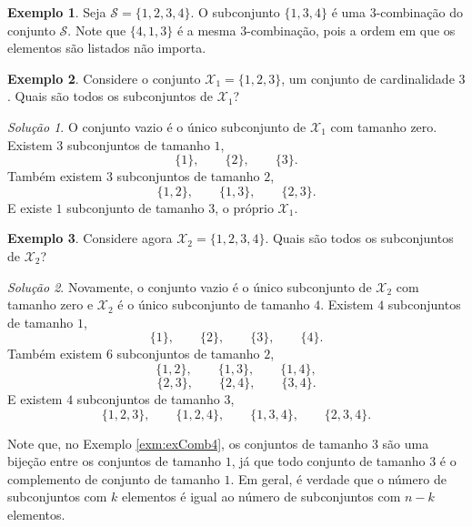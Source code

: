 \documentclass[]{book}
\theoremstyle{definition}
\theoremstyle{definition}
\newtheorem{example}{Exemplo}[chapter]
\theoremstyle{definition}
\theoremstyle{remark}
\newtheorem*{solution}{Solução}
\begin{document}
\begin{example}
\protect\hypertarget{exm:unnamed-chunk-64}{}{\label{exm:unnamed-chunk-64} }Seja \(\mathcal{S} = \{1,2,3,4\}\).
O subconjunto \(\{1,3,4\}\) é uma \(3\)-combinação do conjunto \(\mathcal{S}\).
Note que \(\{4,1,3\}\) é a mesma \(3\)-combinação, pois a ordem em que os elementos são listados não importa.
\end{example}

\begin{example}
\protect\hypertarget{exm:unnamed-chunk-65}{}{\label{exm:unnamed-chunk-65} }Considere o conjunto \(\mathcal{X}_1 = \{1,2,3\}\), um conjunto de cardinalidade \(3\).
Quais são todos os subconjuntos de \(\mathcal{X}_1\)?
\end{example}
\begin{solution}
\iffalse{} {Solução. } \fi{}O conjunto vazio é o único subconjunto de \(\mathcal{X_1}\) com tamanho zero.
Existem \(3\) subconjuntos de tamanho \(1\),
\[ \{1\}, \qquad \{2\}, \qquad \{3\}. \]
Também existem \(3\) subconjuntos de tamanho \(2\),
\[ \{1,2\}, \qquad \{1,3\}, \qquad \{2,3\}. \]
E existe \(1\) subconjunto de tamanho 3, o próprio \(\mathcal{X}_1\).
\end{solution}

\begin{example}
\protect\hypertarget{exm:exComb4}{}{\label{exm:exComb4} }Considere agora \(\mathcal{X}_2 = \{1,2,3,4\}\).
Quais são todos os subconjuntos de \(\mathcal{X}_2\)?
\end{example}

\begin{solution}
\iffalse{} {Solução. } \fi{}Novamente, o conjunto vazio é o único subconjunto de \(\mathcal{X}_2\) com tamanho zero e \(\mathcal{X}_2\) é o único subconjunto de tamanho \(4\).
Existem \(4\) subconjuntos de tamanho \(1\),
\[ \{1\}, \qquad \{2\}, \qquad \{3\}, \qquad \{4\}. \]
Também existem \(6\) subconjuntos de tamanho \(2\),
\[ \{1,2\}, \qquad \{1,3\}, \qquad \{1,4\}, \]
\[ \{2,3\}, \qquad \{2,4\}, \qquad \{3,4\}. \]
E existem \(4\) subconjuntos de tamanho 3,
\[ \{1,2,3\}, \qquad \{1,2,4\}, \qquad \{1,3,4\}, \qquad \{2,3,4\}.\]
\end{solution}

Note que, no Exemplo \ref{exm:exComb4}, os conjuntos de tamanho \(3\) são uma bijeção entre os conjuntos de tamanho \(1\), já que todo conjunto de tamanho \(3\) é o complemento de conjunto de tamanho \(1\).
Em geral, é verdade que o número de subconjuntos com \(k\) elementos é igual ao número de subconjuntos com \(n-k\) elementos.
\end{document}
